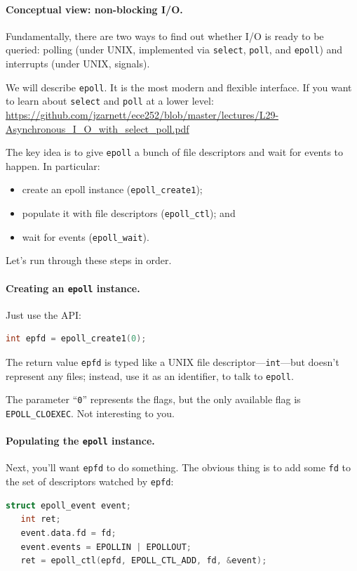 \documentclass[a4paper]{report}
\begin{document}
\paragraph{Conceptual view: non-blocking I/O.} Fundamentally,
there are two ways to find out whether I/O is ready to be queried:
polling (under UNIX, implemented via {\tt select}, {\tt poll},
and {\tt epoll}) and interrupts (under UNIX, signals).


We will describe {\tt epoll}. It is the most modern and
flexible interface. If you want to learn about \texttt{select} and \texttt{poll} at a lower level: \url{https://github.com/jzarnett/ece252/blob/master/lectures/L29-Asynchronous_I_O_with_select_poll.pdf }

The key idea is to give {\tt epoll} a bunch of file descriptors and
wait for events to happen. In particular:
     \begin{itemize}
       \item create an epoll instance ({\tt epoll\_create1});
       \item populate it with file descriptors ({\tt epoll\_ctl}); and
       \item wait for events ({\tt epoll\_wait}).
     \end{itemize}
Let's run through these steps in order.

\paragraph{Creating an {\tt epoll} instance.} Just use the API:
    \begin{lstlisting}[language=C]
   int epfd = epoll_create1(0);
    \end{lstlisting}

The return value {\tt epfd} is typed like a UNIX file
descriptor---{\tt int}---but doesn't represent any files; instead, use
it as an identifier, to talk to {\tt epoll}.

The parameter ``{\tt 0}'' represents the flags, but the only available flag
is {\tt EPOLL\_CLOEXEC}. Not interesting to you.

\paragraph{Populating the {\tt epoll} instance.} Next, you'll want
{\tt epfd} to do something. The obvious thing is to add some {\tt fd}
to the set of descriptors watched by {\tt epfd}:
    \begin{lstlisting}[language=C]
   struct epoll_event event;
   int ret;
   event.data.fd = fd;
   event.events = EPOLLIN | EPOLLOUT;
   ret = epoll_ctl(epfd, EPOLL_CTL_ADD, fd, &event);
    \end{lstlisting}
\end{document}
